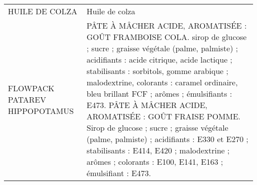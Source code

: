 \begin{longtable}{p{5cm}p{10cm}}
                                                                                           HUILE DE COLZA &                                                                                                                                                                                                                                                                                                                                                                                                                                                                                                                                                                                                                                                                                                                                                                                                                                                                                                                                                                                                                           Huile de colza \\
                                                                            FLOWPACK PATAREV HIPPOPOTAMUS &                                                                                                                                                                                                                                                                                                                                                                                                                                                              PÂTE À MÂCHER ACIDE, AROMATISÉE : GOÛT FRAMBOISE COLA.  sirop de glucose ; sucre ; graisse végétale (palme, palmiste) ; acidifiants : acide citrique, acide lactique ; stabilisants : sorbitols, gomme arabique ; malodextrine, colorants : caramel ordinaire, bleu brillant FCF ; arômes ; émulsifiants : E473.  PÂTE À MÂCHER ACIDE, AROMATISÉE : GOÛT FRAISE POMME.  Sirop de glucose ; sucre ; graisse végétale (palme, palmiste) ; acidifiants : E330 et E270 ; stabilisants : E414, E420 ; malodextrine ; arômes ; colorants : E100, E141, E163 ; émulsifiant : E473. \\

\end{longtable}
